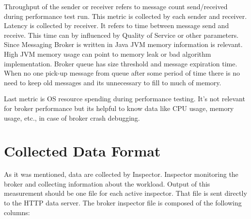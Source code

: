 Throughput of the sender or receiver refers to message count send/received during performance test run. This metric is collected by each sender and receiver. Latency is collected by receiver. It refers to time between message send and receive. This time can by influenced by Quality of Service or other parameters. Since Messaging Broker is written in Java JVM memory information is relevant. High JVM memory usage can point to memory leak or bad algorithm implementation.  Broker queue has size threshold and message expiration time. When no one pick-up message from queue after some period of time there is no need to keep old messages and its unnecessary to fill to much of memory.

Last metric is OS resource spending during performance testing. It's not relevant for broker performance but its helpful to know data like CPU usage, memory usage, etc., in case of broker crash debugging.

\section{Collected Data Format}
\label{Collected Data Format}
As it was mentioned, data are collected by Inspector. Inspector monitoring the broker and collecting information about the workload. Output of this measurement should be one file for each active inspector. That file is sent directly to the HTTP data server. The broker inspector file is composed of the following columns:

